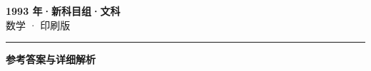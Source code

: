 \documentclass[zihao=5, a4paper]{ctexart}
\begin{document}
\begin{center}
  {\Large\bfseries 1993 年·新科目组·文科}\\[4pt]
  {\large 数学 · 印刷版}
\end{center}
\medskip
{}

\par\bigskip\hrule\bigskip
{}
\begin{center}{\large\bfseries 参考答案与详细解析}\end{center}
\smallskip

\end{document}
